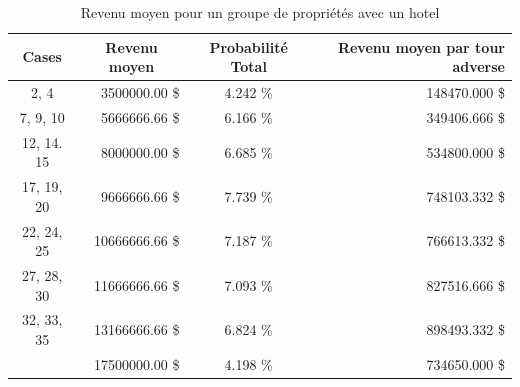 \documentclass[letterpaper]{article}
\begin{document}
    \begin{table}
      \centering
      \begin{tabular}{|c|r|c|r|}
      \hline
      \multicolumn{1}{|c|}{\textbf{Cases}} &
      \multicolumn{1}{c|}{\textbf{Revenu moyen}} & 
      \multicolumn{1}{p{1.5cm}|}{\centering \textbf{Probabilité Total}} & 
      \multicolumn{1}{p{2cm}|}{\centering \textbf{Revenu moyen par tour adverse}} \\ \hline %
      \cellcolor[HTML]{A0522D} 2, 4                      & 3500000.00 \$  & 4.242 \% & 148470.000 \$ \\ \hline
      \cellcolor[HTML]{1E90FF} 7, 9, 10                  & 5666666.66 \$  & 6.166 \% & 349406.666 \$ \\ \hline
      \cellcolor[HTML]{FF69B4} 12, 14. 15                & 8000000.00 \$  & 6.685 \% & 534800.000 \$ \\ \hline
      \cellcolor[HTML]{FF8C00} 17, 19, 20                & 9666666.66 \$  & 7.739 \% & 748103.332 \$ \\ \hline
      \cellcolor[HTML]{FF4500} 22, 24, 25                & 10666666.66 \$ & 7.187 \% & 766613.332 \$ \\ \hline
      \cellcolor[HTML]{FFD700} 27, 28, 30                & 11666666.66 \$ & 7.093 \% & 827516.666 \$ \\ \hline
      \cellcolor[HTML]{2E8B57} 32, 33, 35                & 13166666.66 \$ & 6.824 \% & 898493.332 \$ \\ \hline
      \cellcolor[HTML]{483D8B} \textcolor{white}{38, 40} & 17500000.00 \$ & 4.198 \% & 734650.000 \$ \\ \hline
      \end{tabular}
      \caption{Revenu moyen pour un groupe de propriétés avec un hotel}
      \label{table:result_revenu_couleur_paye}
    \end{table}
    
    
\end{document}
